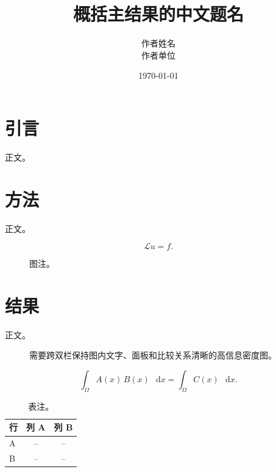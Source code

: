 \documentclass[UTF8,a4paper,10pt,twocolumn]{ctexart}
\title{概括主结果的中文题名}
\author{作者姓名\\\small 作者单位}
\date{\today}
\providecommand{\dd}{\mathop{}\!\mathrm{d}}
\theoremstyle{definition}
\theoremstyle{remark}
\begin{document}

\section{引言}

正文。

\section{方法}

正文。

\begin{equation}
  \mathcal{L}u = f .
  \label{eq:example-zh}
\end{equation}

\begin{figure}[t]
  \centering
  \fbox{\rule{0pt}{1.35in}\rule{0.90\columnwidth}{0pt}}
  \caption{图注。\label{fig:example-zh}}
\end{figure}

\section{结果}

正文。

\begin{figure}[t]
  \centering
  \fbox{\rule{0pt}{1.55in}\rule{0.96\textwidth}{0pt}}
  \caption{需要跨双栏保持图内文字、面板和比较关系清晰的高信息密度图。\label{fig:two-column-zh}}
\end{figure}

\begin{equation}
  \int_{\Omega} A(x)\,B(x)\,\dd x
  =
  \int_{\Omega} C(x)\,\dd x .
  \label{eq:wide-example-zh}
\end{equation}

\begin{table}[b]
  \caption{表注。\label{tab:example-zh}}
  \begin{tabular}{lcc}
  \toprule
  行 & 列 A & 列 B \\
  \midrule
  A & -- & -- \\
  B & -- & -- \\
  \bottomrule
  \end{tabular}
\end{table}
\end{document}
